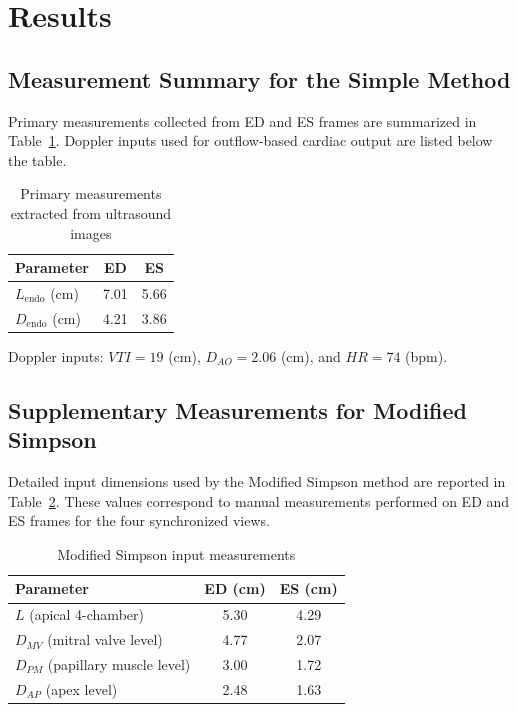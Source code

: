 \section{Results}

\subsection{Measurement Summary for the Simple Method}
Primary measurements collected from ED and ES frames are summarized in Table~\ref{tab:raw-measurements}. Doppler inputs used for outflow-based cardiac output are listed below the table.

\begin{table}[htbp]
\caption{Primary measurements extracted from ultrasound images}
\label{tab:raw-measurements}
\centering
\begin{tabular}{lcc}
\toprule
Parameter & ED & ES \\
\midrule
$L_{\mathrm{endo}}$ (cm) & 7.01 & 5.66 \\
$D_{\mathrm{endo}}$ (cm) & 4.21 & 3.86 \\
\bottomrule
\end{tabular}
\end{table}

\noindent Doppler inputs: $VTI = 19$ (cm), $D_{AO} = 2.06$ (cm), and $HR = 74$ (bpm).

\subsection{Supplementary Measurements for Modified Simpson}
Detailed input dimensions used by the Modified Simpson method are reported in Table~\ref{tab:simpson-inputs}. These values correspond to manual measurements performed on ED and ES frames for the four synchronized views.

\begin{table}[htbp]
\caption{Modified Simpson input measurements}
\label{tab:simpson-inputs}
\centering
\begin{tabular}{lcc}
\toprule
Parameter & ED (cm) & ES (cm) \\
\midrule
$L$ (apical 4-chamber) & 5.30 & 4.29 \\
$D_{MV}$ (mitral valve level) & 4.77 & 2.07 \\
$D_{PM}$ (papillary muscle level) & 3.00 & 1.72 \\
$D_{AP}$ (apex level) & 2.48 & 1.63 \\
\bottomrule
\end{tabular}
\end{table}

